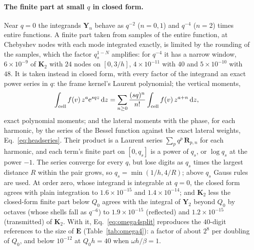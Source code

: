 \documentclass[11pt,a4paper]{article}
\newcommand{\bK}{\mathbf{K}}
\newcommand{\dd}{\mathrm{d}}
\newcommand{\ee}{\mathrm{e}}
\begin{document}
\paragraph{The finite part at small $q$ in closed form.} Near $q=0$ the integrands $\mathbf Y_n$ behave as
$q^{-2}$ ($n=0,1$) and $q^{-4}$ ($n=2$) times entire functions. A finite part taken from samples of the entire
function, at Chebyshev nodes with each mode integrated exactly, is limited by the rounding of the samples, which
the factor $q_s^{1-N}$ amplifies: for $q^{-4}$ it has a narrow window, $6\times10^{-9}$ of $\bK_2$ with $24$ nodes
on $[0,3/h]$, $4\times10^{-11}$ with $40$ and $5\times10^{-10}$ with $48$. It is taken instead in closed form, with
every factor of the integrand an exact power series in $q$: the frame kernel's Laurent polynomial; the vertical
moments,
\begin{equation}\label{eq:verticalseries}
  \int_{\rm cell}f(v)\,z^{a}\ee^{sqz}\,\dd z=\sum_{n\ge0}\frac{(sq)^n}{n!}\int_{\rm cell}f(v)\,z^{a+n}\,\dd z,
\end{equation}
exact polynomial moments; and the lateral moments with the phase, for each harmonic, by the series of the Bessel
function against the exact lateral weights, Eq.~\eqref{eq:headseries}. Their product is a Laurent series
$\sum_pq^p\,\mathbf R_{p,n}$ for each harmonic, and each term's finite part on $[0,q_s]$ is a power of $q_s$, or
$\log q_s$ at the power $-1$. The series converge for every $q$, but lose digits as $q_s$ times the largest distance
$R$ within the pair grows, so $q_s=\min(1/h,4/R)$; above $q_s$ Gauss rules are used. At order zero, whose
integrand is integrable at $q=0$, the closed form agrees with plain integration to $1.6\times10^{-15}$ and
$1.4\times10^{-14}$; and $\bK_2$ less the closed-form finite part below $Q_0$ agrees with the integral of
$\mathbf Y_2$ beyond $Q_0$ by octaves (whose shells fall as $q^{-6}$) to $1.9\times10^{-15}$ (reflected) and
$1.2\times10^{-15}$ (transmitted) of $\bK_2$. With it, Eq.~\eqref{eq:omega4split} reproduces the $40$-digit
references to the size of $\mathbf E$ (Table~\ref{tab:omega4}): a factor of about $2^8$ per doubling of $Q_0$, and
below $10^{-12}$ at $Q_0h=40$ when $\omega h/\beta=1$.
\end{document}
